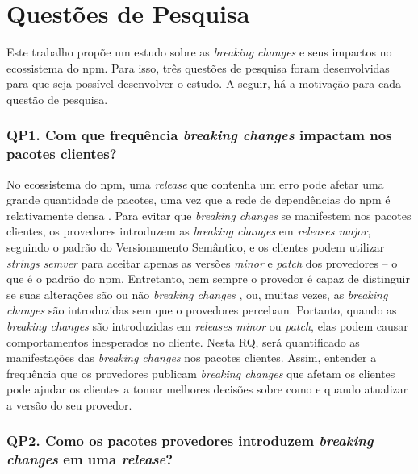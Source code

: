 \section{Questões de Pesquisa}
\label{sec:qp}

Este trabalho propõe um estudo sobre as \textit{breaking changes} e seus impactos no ecossistema do \gls{npm}. Para isso, três questões de pesquisa foram desenvolvidas para que seja possível desenvolver o estudo. A seguir, há a motivação para cada questão de pesquisa.

\subsubsection{QP1. Com que frequência \textit{breaking changes} impactam nos pacotes clientes?}

No ecossistema do \gls{npm}, uma \textit{release} que contenha um erro pode afetar uma grande quantidade de pacotes, uma vez que a rede de dependências do npm é relativamente densa \cite{teorical_reference:npm_2}. Para evitar que \textit{breaking changes} se manifestem nos pacotes clientes, os provedores introduzem as \textit{breaking changes} em \textit{releases major}, seguindo o padrão do Versionamento Semântico, e os clientes podem utilizar \textit{strings semver} para aceitar apenas as versões \textit{minor} e \textit{patch} dos provedores -- o que é o padrão do \gls{npm}. Entretanto, nem sempre o provedor é capaz de distinguir se suas alterações são ou não \textit{breaking changes} \cite{noregrets2018}, ou, muitas vezes, as \textit{breaking changes} são introduzidas sem que o provedores percebam. Portanto, quando as \textit{breaking changes} são introduzidas em \textit{releases minor} ou \textit{patch}, elas podem causar comportamentos inesperados no cliente. Nesta RQ, será quantificado as manifestações das \textit{breaking changes} nos pacotes clientes. Assim, entender a frequência que os provedores publicam \textit{breaking changes} que afetam os clientes pode ajudar os clientes a tomar melhores decisões sobre como e quando atualizar a versão do seu provedor.

\subsubsection{QP2. Como os pacotes provedores introduzem \textit{breaking changes} em uma \textit{release}?}

